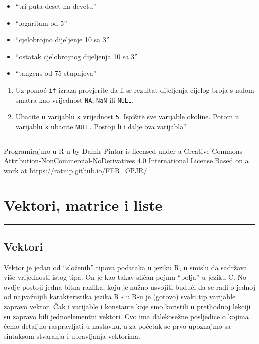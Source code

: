 \documentclass[]{book}
\providecommand{\tightlist}{%
  \setlength{\itemsep}{0pt}\setlength{\parskip}{0pt}}
\theoremstyle{definition}
\theoremstyle{definition}
\theoremstyle{definition}
\theoremstyle{remark}
\begin{document}
\begin{itemize}
\tightlist
\item
  ``tri puta deset na devetu''
\item
  ``logaritam od 5''
\item
  ``cjelobrojno dijeljenje 10 sa 3''
\item
  ``ostatak cjelobrojnog dijeljenja 10 sa 3''
\item
  ``tangens od 75 stupnjeva'' \textbar{}
\end{itemize}

\begin{enumerate}
\def\labelenumi{\arabic{enumi}.}
\setcounter{enumi}{2}
\item
  Uz pomoć \texttt{if} izraza provjerite da li se rezultat dijeljenja
  cijelog broja s nulom smatra kao vrijednost \texttt{NA}, \texttt{NaN}
  ili \texttt{NULL}.
\item
  Ubacite u varijablu \texttt{x} vrijednost \texttt{5}. Ispišite sve
  varijable okoline. Potom u varijablu \texttt{x} ubacite \texttt{NULL}.
  Postoji li i dalje ova varijabla?
\end{enumerate}

\begin{center}\rule{0.5\linewidth}{\linethickness}\end{center}

{Programirajmo u R-u} by Damir Pintar is licensed under a Creative
Commons Attribution-NonCommercial-NoDerivatives 4.0 International
License.Based on a work at https://ratnip.github.io/FER\_OPJR/

\chapter{Vektori, matrice i liste}\label{vektori}

\begin{center}\rule{0.5\linewidth}{\linethickness}\end{center}

\section{Vektori}\label{vektori}

Vektor je jedan od ``složenih'' tipova podataka u jeziku R, u smislu da
sadržava više vrijednosti istog tipa. On je kao takav sličan pojmu
``polja'' u jeziku C. No ovdje postoji jedna bitna razlika, koju je
nužno usvojiti budući da se radi o jednoj od najvažnijih karakteristika
jezika R - u R-u je (gotovo) svaki tip varijable zapravo vektor. Čak i
varijable i konstante koje smo koristili u prethodnoj lekciji su zapravo
bili jednoelementni vektori. Ovo ima dalekosežne posljedice o kojima
ćemo detaljno raspravljati u nastavku, a za početak se prvo upoznajmo sa
sintaksom stvaranja i upravljanja vektorima.
\end{document}
